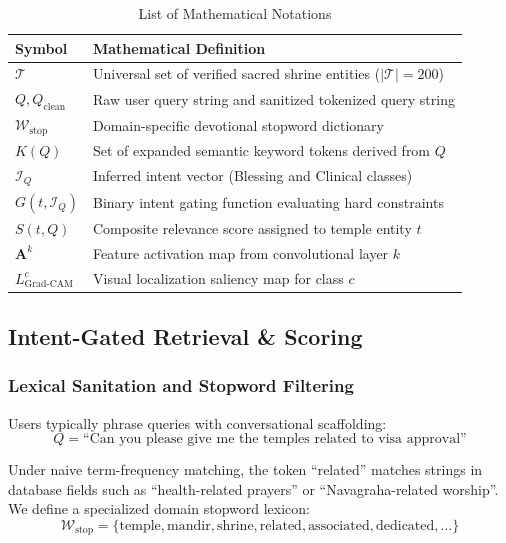 \documentclass[lettersize,journal]{IEEEtran}
\begin{document}
\begin{table}[htbp]
\caption{List of Mathematical Notations}
\centering
\begin{tabular}{ll}
\toprule
\textbf{Symbol} & \textbf{Mathematical Definition} \\
\midrule
$\mathcal{T}$ & Universal set of verified sacred shrine entities ($|\mathcal{T}| = 200$) \\
$Q, Q_{\text{clean}}$ & Raw user query string and sanitized tokenized query string \\
$\mathcal{W}_{\text{stop}}$ & Domain-specific devotional stopword dictionary \\
$K(Q)$ & Set of expanded semantic keyword tokens derived from $Q$ \\
$\mathcal{I}_Q$ & Inferred intent vector (Blessing and Clinical classes) \\
$G(t, \mathcal{I}_Q)$ & Binary intent gating function evaluating hard constraints \\
$S(t, Q)$ & Composite relevance score assigned to temple entity $t$ \\
$\mathbf{A}^k$ & Feature activation map from convolutional layer $k$ \\
$L^c_{\text{Grad-CAM}}$ & Visual localization saliency map for class $c$ \\
\bottomrule
\end{tabular}
\end{table}

\subsection{Intent-Gated Retrieval \& Scoring}
\subsubsection{Lexical Sanitation and Stopword Filtering}
Users typically phrase queries with conversational scaffolding:
\begin{equation}
Q = \text{``Can you please give me the temples related to visa approval''}
\end{equation}

Under naive term-frequency matching, the token ``related'' matches strings in database fields such as ``health-related prayers'' or ``Navagraha-related worship''. We define a specialized domain stopword lexicon:
\begin{equation}
\mathcal{W}_{\text{stop}} = \{\text{temple}, \text{mandir}, \text{shrine}, \text{related}, \text{associated}, \text{dedicated}, \dots\}
\end{equation}
\end{document}
